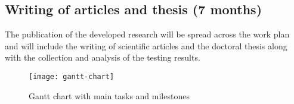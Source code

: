 \subsection{Writing of articles and thesis (7 months)}

The publication of the developed research will be spread across the work plan and will include the writing of scientific articles and the doctoral thesis along with the collection and analysis of the testing results.



\begin{figure}[H]
	\centering
	\texttt{[image: gantt-chart]}
	\caption{Gantt chart with main tasks and milestones}
	\label{fig:gantt-chart}
\end{figure}

